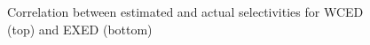 \documentclass{sigmod}
\begin{document}
\begin{figure}[htb]
\setlength{\belowcaptionskip}{-1\baselineskip}
\centering
{}
\vspace{-2\baselineskip}

\vspace{-2\baselineskip}
\caption{Correlation between estimated and actual selectivities for WCED (top) and EXED (bottom)}
\label{fig:sels}
\end{figure}
\end{document}
